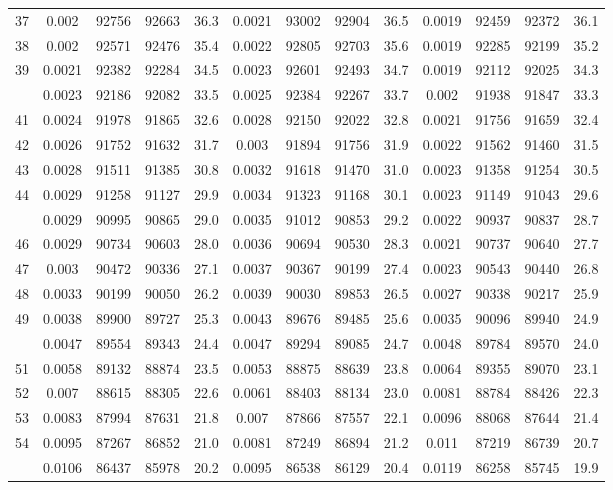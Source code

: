 \documentclass[
  14pt,
]{article}
\begin{document}
\begin{longtable}[t]{lcccccccccccc}
37 & 0.002 & 92756 & 92663 & 36.3 & 0.0021 & 93002 & 92904 & 36.5 & 0.0019 & 92459 & 92372 & 36.1\\
38 & 0.002 & 92571 & 92476 & 35.4 & 0.0022 & 92805 & 92703 & 35.6 & 0.0019 & 92285 & 92199 & 35.2\\
39 & 0.0021 & 92382 & 92284 & 34.5 & 0.0023 & 92601 & 92493 & 34.7 & 0.0019 & 92112 & 92025 & 34.3\\
\addlinespace
40 & 0.0023 & 92186 & 92082 & 33.5 & 0.0025 & 92384 & 92267 & 33.7 & 0.002 & 91938 & 91847 & 33.3\\
41 & 0.0024 & 91978 & 91865 & 32.6 & 0.0028 & 92150 & 92022 & 32.8 & 0.0021 & 91756 & 91659 & 32.4\\
42 & 0.0026 & 91752 & 91632 & 31.7 & 0.003 & 91894 & 91756 & 31.9 & 0.0022 & 91562 & 91460 & 31.5\\
43 & 0.0028 & 91511 & 91385 & 30.8 & 0.0032 & 91618 & 91470 & 31.0 & 0.0023 & 91358 & 91254 & 30.5\\
44 & 0.0029 & 91258 & 91127 & 29.9 & 0.0034 & 91323 & 91168 & 30.1 & 0.0023 & 91149 & 91043 & 29.6\\
\addlinespace
45 & 0.0029 & 90995 & 90865 & 29.0 & 0.0035 & 91012 & 90853 & 29.2 & 0.0022 & 90937 & 90837 & 28.7\\
46 & 0.0029 & 90734 & 90603 & 28.0 & 0.0036 & 90694 & 90530 & 28.3 & 0.0021 & 90737 & 90640 & 27.7\\
47 & 0.003 & 90472 & 90336 & 27.1 & 0.0037 & 90367 & 90199 & 27.4 & 0.0023 & 90543 & 90440 & 26.8\\
48 & 0.0033 & 90199 & 90050 & 26.2 & 0.0039 & 90030 & 89853 & 26.5 & 0.0027 & 90338 & 90217 & 25.9\\
49 & 0.0038 & 89900 & 89727 & 25.3 & 0.0043 & 89676 & 89485 & 25.6 & 0.0035 & 90096 & 89940 & 24.9\\
\addlinespace
50 & 0.0047 & 89554 & 89343 & 24.4 & 0.0047 & 89294 & 89085 & 24.7 & 0.0048 & 89784 & 89570 & 24.0\\
51 & 0.0058 & 89132 & 88874 & 23.5 & 0.0053 & 88875 & 88639 & 23.8 & 0.0064 & 89355 & 89070 & 23.1\\
52 & 0.007 & 88615 & 88305 & 22.6 & 0.0061 & 88403 & 88134 & 23.0 & 0.0081 & 88784 & 88426 & 22.3\\
53 & 0.0083 & 87994 & 87631 & 21.8 & 0.007 & 87866 & 87557 & 22.1 & 0.0096 & 88068 & 87644 & 21.4\\
54 & 0.0095 & 87267 & 86852 & 21.0 & 0.0081 & 87249 & 86894 & 21.2 & 0.011 & 87219 & 86739 & 20.7\\
\addlinespace
55 & 0.0106 & 86437 & 85978 & 20.2 & 0.0095 & 86538 & 86129 & 20.4 & 0.0119 & 86258 & 85745 & 19.9\\

\end{longtable}
\end{document}
